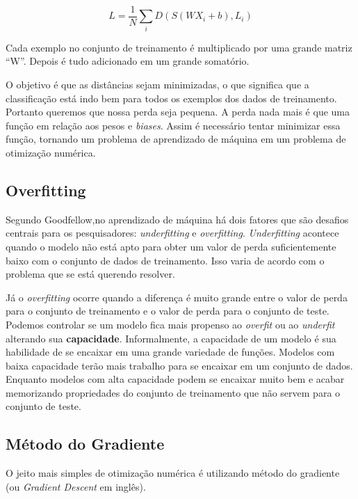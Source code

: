 \begin{equation}
  L = \displaystyle\frac{1}{N}\displaystyle\sum_iD(S(WX_i + b), L_i)
\end{equation}

Cada exemplo no conjunto de treinamento é multiplicado por uma grande
matriz ``W''. Depois é tudo adicionado em um grande somatório.

O objetivo é que as distâncias sejam minimizadas, o que significa que a
classificação está indo bem para todos os exemplos dos dados de
treinamento. Portanto queremos que nossa perda seja pequena. A
perda nada mais é que uma função em relação aos pesos e
\textit{biases}. Assim é necessário tentar minimizar essa função,
tornando um problema de aprendizado de máquina em um problema de
otimização numérica.

\subsection{Overfitting}

Segundo Goodfellow\cite{Goodfellow-et-al-2016-Book},no aprendizado de
máquina há dois fatores que são desafios centrais para os
pesquisadores: \textit{underfitting} e
\textit{overfitting}. \textit{Underfitting} acontece quando o modelo
não está apto para obter um valor de perda suficientemente baixo com o
conjunto de dados de treinamento. Isso varia de acordo com o problema
que se está querendo resolver.

Já o \textit{overfitting} ocorre quando a diferença é muito grande
entre o valor de perda para o conjunto de treinamento e o valor de
perda para o conjunto de teste. Podemos controlar se um modelo fica
mais propenso ao \textit{overfit} ou ao \textit{underfit} alterando
sua {\bf capacidade}. Informalmente, a capacidade de um modelo é sua
habilidade de se encaixar em uma grande variedade de funções. Modelos
com baixa capacidade terão mais trabalho para se encaixar em um
conjunto de dados. Enquanto modelos com alta capacidade podem se
encaixar muito bem e acabar memorizando propriedades do conjunto de
treinamento que não servem para o conjunto de teste.

\subsection{Método do Gradiente}

O jeito mais simples de otimização numérica é utilizando método do
gradiente (ou \textit{Gradient Descent} em inglês).

